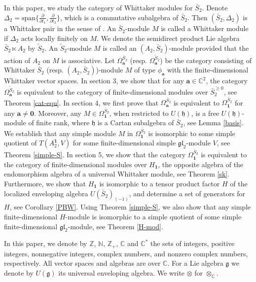\documentclass[12pt,a4paper]{amsart}
\def\C{\mathbb{C}}
\def\mh{\mathfrak{h}}
\def\ba{\mathbf{a}}
\def\gl{\mathfrak{gl}}
\def\bS{\bar{S}_2}
\begin{document}
In this paper, we study the category of Whittaker modules for $\bar{S}_2$.
Denote $\Delta_2=\text{span}\{\frac{\partial}{\partial{t_1}},\frac{\partial}{\partial{t_2}}\}$, which is a commutative subalgebra of $\bS$.
Then $(\bS, \Delta_2)$ is a Whittaker pair in the sense of \cite{PV}.
An $\bS$-module $M$ is called a Whittaker module if $\Delta_2$ acts locally finitely on $M$.
We denote the semidirect product Lie algebra $\bS\ltimes A_2$ by $\widetilde{S}_2$.
 An $\widetilde{S}_2$-module $M$ is called an $(A_2, \bar{S}_2)$-module provided that the action of  $A_2$  on $M$ is associative.
Let $\Omega^{\bar{S}_2}_{\ba}$ (resp. $\Omega^{\widetilde{S}_2}_{\ba}$) be the category consisting of Whittaker $\bar{S}_2$ (resp. $(A_2, \bar{S}_2)$)-module $M$ of type $\phi_\ba$ with the finite-dimensional Whittaker vector spaces.
In section 3, we show that for any $\ba\in\C^2$, the category $\Omega^{\widetilde{S}_2}_{\ba}$ is equivalent to the category of finite-dimensional modules over $\bar{S}_2^{\geq 0}$, see Theorem \ref{cat-equ}.  In section 4, we first prove that $\Omega^{\bar{S}_2}_{\mathbf{a}}$ is equivalent to $\Omega^{\bar{S}_2}_{\mathbf{1}}$ for any $\mathbf{a}\neq \mathbf{0}$.
Moreover, any $M\in \Omega^{\bar{S}_2}_{\mathbf{1}}$, when restricted to $U(\mh)$, is a free
$U(\mh)$-module of finite rank, where
$\mh$ is a Cartan subalgebra of $\bS$, see Lemma \ref{basis}. We establish that any simple module $M$ in $\Omega^{\bar{S}_2}_{\mathbf{1}}$ is isomorphic to some simple quotient of $T(A^{\mathbf{1}}_{2},V)$ for some finite-dimensional simple $\gl_2$-module $V$, see Theorem \ref{simple-S}.
In section 5, we show that the  category $\Omega_{\mathbf{1}}^{\bS}$ is equivalent to the category of finite-dimensional modules over $H_{\mathbf{1}}$, the opposite algebra of the endomorphism algebra of a universal Whittaker module, see Theorem \ref{sk}. Furthermore, we show that
$H_{\mathbf{1}}$ is isomorphic to a tensor product factor $H$ of  the localized enveloping algebra  $U(\bar{S}_2)_{(-1)}$, and determine a set of generators for  $H$, see Corollary \ref{PBW}. Using Theorem \ref{simple-S}, we also show that any
 simple finite-dimensional $H$-module is isomorphic to
a simple quotient of some simple finite-dimensional $\gl_2$-module, see Theorem \ref{H-mod}.

In this paper, we denote by $\mathbb{Z}$, $\mathbb{N}$, $\mathbb{Z_+}$, $\mathbb{C}$ and $\mathbb{C}^*$ the sets of integers, positive integers, nonnegative integers, complex numbers, and nonzero complex numbers, respectively. All vector spaces and algebras are over $\C$. For a Lie algebra
$\mathfrak{g}$ we denote by $U(\mathfrak{g})$ its universal enveloping algebra. We write $\otimes$ for
$\otimes_{\mathbb{C}}$.
\end{document}

